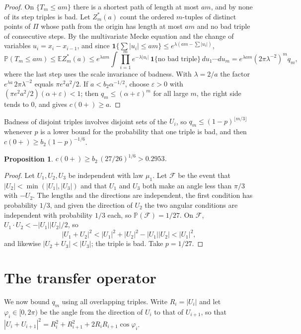 \documentclass[11pt]{article}
\newtheorem{proposition}[theorem]{Proposition}
\theoremstyle{remark}
\newcommand{\E}{\mathbb{E}}
\newcommand{\Prob}{\mathbb{P}}
\begin{document}
\begin{proof}
On $\{T_m\le am\}$ there is a shortest path of length at most $am$, and by  none of its step triples is
bad. Let $Z^*_m(a)$ count the ordered $m$-tuples of distinct points of $\Pi$ whose path from the origin has length at
most $am$ and no bad triple of consecutive steps. By the multivariate Mecke equation and the change of variables $u_i=x_i-x_{i-1}$, and since
$\mathbf 1\{\sum|u_i|\le am\}\le e^{\lambda(am-\sum|u_i|)}$,
\[
\Prob(T_m\le am)\le\E Z^*_m(a)\le e^{\lambda am}\int\prod_{i=1}^m e^{-\lambda|u_i|}\,
\mathbf 1\{\text{no bad triple}\}\,du_1\cdots du_m=e^{\lambda am}(2\pi\lambda^{-2})^m q_m ,
\]
where the last step uses the scale invariance of badness. With $\lambda=2/a$ the factor $e^{\lambda a}\,2\pi\lambda^{-2}$ equals $\pi e^2a^2/2$. If
$a<b_2\alpha^{-1/2}$, choose $\varepsilon>0$ with $(\pi e^2a^2/2)(\alpha+\varepsilon)<1$; then
$q_m\le(\alpha+\varepsilon)^m$ for all large $m$, the right side tends to $0$, and \cite[Theorem~1(e)]{AK} gives $c(0+)\ge a$.
\end{proof}

Badness of disjoint triples involves disjoint sets of the $U_i$, so $q_m\le(1-p)^{\lfloor m/3\rfloor}$ whenever
$p$ is a lower bound for the probability that one triple is bad, and then $c(0+)\ge b_2(1-p)^{-1/6}$.

\begin{proposition}\label{prop:hand}
$c(0+)\ge b_2\,(27/26)^{1/6}>0.2953$.
\end{proposition}

\begin{proof}
Let $U_1,U_2,U_3$ be independent with law $\mu_1$. Let $\mathcal F$ be the event that $|U_2|<\min(|U_1|,|U_3|)$ and that $U_1$ and $U_3$
both make an angle less than $\pi/3$ with $-U_2$. The lengths and the directions are independent, the first condition
has probability $1/3$, and given the direction of $U_2$ the two angular conditions are independent with probability
$1/3$ each, so $\Prob(\mathcal F)=1/27$. On $\mathcal F$, $U_1\cdot U_2<-|U_1||U_2|/2$, so
\[
|U_1+U_2|^2<|U_1|^2+|U_2|^2-|U_1||U_2|<|U_1|^2,
\]
and likewise $|U_2+U_3|<|U_3|$; the triple is bad. Take $p=1/27$.
\end{proof}

\section{The transfer operator}\label{sec:transfer}

We now bound $q_m$ using all overlapping triples. Write $R_i=|U_i|$ and let $\varphi_i\in[0,2\pi)$ be the angle from
the direction of $U_i$ to that of $U_{i+1}$, so that $|U_i+U_{i+1}|^2=R_i^2+R_{i+1}^2+2R_iR_{i+1}\cos\varphi_i$.
\end{document}
